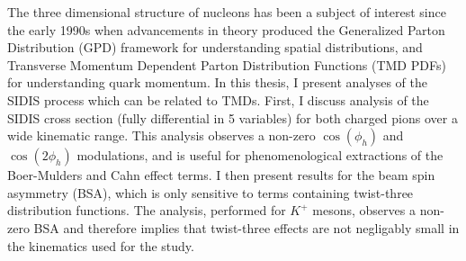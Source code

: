The three dimensional structure of nucleons has been a subject of interest since the early 1990s when advancements in theory produced the Generalized Parton Distribution (GPD) framework for understanding spatial distributions, and Transverse Momentum Dependent Parton Distribution Functions (TMD PDFs) for understanding quark momentum.  In this thesis, I present analyses of the SIDIS process which can be related to TMDs.  First, I discuss analysis of the SIDIS cross section (fully differential in 5 variables) for both charged pions over a wide kinematic range.  This analysis observes a non-zero $\cos(\phi_h)$ and $\cos(2\phi_h)$ modulations, and is useful for phenomenological extractions of the Boer-Mulders and Cahn effect terms.  I then present results for the beam spin asymmetry (BSA), which is only sensitive to terms containing twist-three distribution functions.  The analysis, performed for $K^+$ mesons, observes a non-zero BSA and therefore implies that twist-three effects are not negligably small in the kinematics used for the study.  

